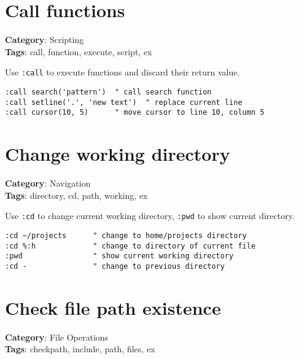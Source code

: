 {{{{{{\section{Call functions}

\textbf{Category}: Scripting\\ \textbf{Tags}: call, function, execute, script, ex
\vspace{0.5cm}

Use {\footnotesize \Verb§:call§} to execute functions and discard their return value.

\begin{Exa*}{}
\begin{Verbatim}[fontsize=\footnotesize, breaklines, breakanywhere]
:call search('pattern')  " call search function
:call setline('.', 'new text')  " replace current line
:call cursor(10, 5)      " move cursor to line 10, column 5
\end{Verbatim}
\end{Exa*}

\section{Change working directory}

\textbf{Category}: Navigation\\ \textbf{Tags}: directory, cd, path, working, ex
\vspace{0.5cm}

Use {\footnotesize \Verb§:cd§} to change current working directory, {\footnotesize \Verb§:pwd§} to show current directory.

\begin{Exa*}{}
\begin{Verbatim}[fontsize=\footnotesize, breaklines, breakanywhere]
:cd ~/projects      " change to home/projects directory
:cd %:h             " change to directory of current file
:pwd                " show current working directory
:cd -               " change to previous directory
\end{Verbatim}
\end{Exa*}

\section{Check file path existence}

\textbf{Category}: File Operations\\ \textbf{Tags}: checkpath, include, path, files, ex
\vspace{0.5cm}

}}}}}}
